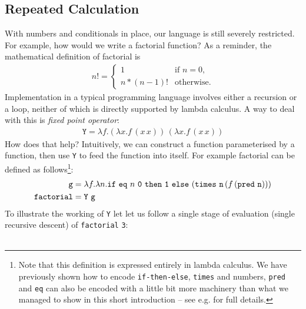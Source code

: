 \documentclass[11pt,twoside,a4paper]{article} %
\newcommand{\mkw}[1]{{\bf \mathtt{#1}}}
\newcommand{\sym}[1]{\texttt{#1}}
\newcommand{\msym}[1]{\mathtt{#1}}
\begin{document}
\subsection{Repeated Calculation}

With numbers and conditionals in place, our language is still severely
restricted. For example, how would we write a factorial function? As a
reminder, the mathematical definition of factorial is
\begin{align*}
n!=\begin{cases}
    1 & \text{if $n=0$},\\
    n*(n-1)! & \text{otherwise}.
  \end{cases}
\end{align*}
Implementation in a typical programming language involves either a recursion or
a loop, neither of which is directly supported by lambda calculus. A way to
deal with this is \emph{fixed point operator}:
\begin{align*}
\msym{Y}=\lambda f.(\lambda x.f\,(x\,x))\,(\lambda x.f\,(x\,x))
\end{align*}
How does that help? Intuitively, we can construct a function parameterised by a 
function, then use \sym{Y} to feed the function into itself. For example factorial
can be defined as follows\footnote{Note that this definition is expressed 
entirely in lambda calculus. We have
previously shown how to encode \sym{if-then-else}, \sym{times} and numbers,
\sym{pred} and \sym{eq} can also be encoded with a little bit more machinery
than what we managed to show in this short introduction -- see e.g. \cite{TAPL} for 
full details.}:
\begin{align*}
\msym{g} &= \lambda f.\lambda
n.\mkw{if}\ \msym{eq}\ n\ \msym{0}\ \mkw{then}\ \msym{1}\ \mkw{else}\ (\msym{times}\ \msym{n}\,(f\,(\msym{pred}\ \msym{n}))) \\
\msym{factorial} &= \msym{Y}\ \msym{g}
\end{align*}
To illustrate the working of \sym{Y} let let us follow a single stage of evaluation
(single recursive descent) of \sym{factorial} \sym{3}:
\\\\
\end{document}
